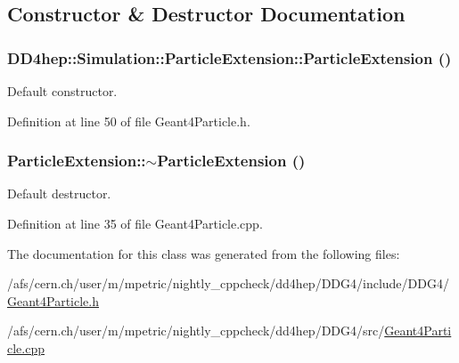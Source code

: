 \subsection{Constructor \& Destructor Documentation}
\hypertarget{class_d_d4hep_1_1_simulation_1_1_particle_extension_a6bd53f39e129dedd6a17a7e60c0c03af}{
\subsubsection[{ParticleExtension}]{\setlength{\rightskip}{0pt plus 5cm}DD4hep::Simulation::ParticleExtension::ParticleExtension ()}}
\label{class_d_d4hep_1_1_simulation_1_1_particle_extension_a6bd53f39e129dedd6a17a7e60c0c03af}


Default constructor. 

Definition at line 50 of file Geant4Particle.h.\hypertarget{class_d_d4hep_1_1_simulation_1_1_particle_extension_aed2fb52f3a28221b701ab44dee8ed576}{
\subsubsection[{$\sim$ParticleExtension}]{\setlength{\rightskip}{0pt plus 5cm}ParticleExtension::$\sim$ParticleExtension ()}}
\label{class_d_d4hep_1_1_simulation_1_1_particle_extension_aed2fb52f3a28221b701ab44dee8ed576}


Default destructor. 

Definition at line 35 of file Geant4Particle.cpp.

The documentation for this class was generated from the following files:\begin{DoxyCompactItemize}
\item 
/afs/cern.ch/user/m/mpetric/nightly\_\-cppcheck/dd4hep/DDG4/include/DDG4/\hyperlink{_geant4_particle_8h}{Geant4Particle.h}\item 
/afs/cern.ch/user/m/mpetric/nightly\_\-cppcheck/dd4hep/DDG4/src/\hyperlink{_geant4_particle_8cpp}{Geant4Particle.cpp}\end{DoxyCompactItemize}

